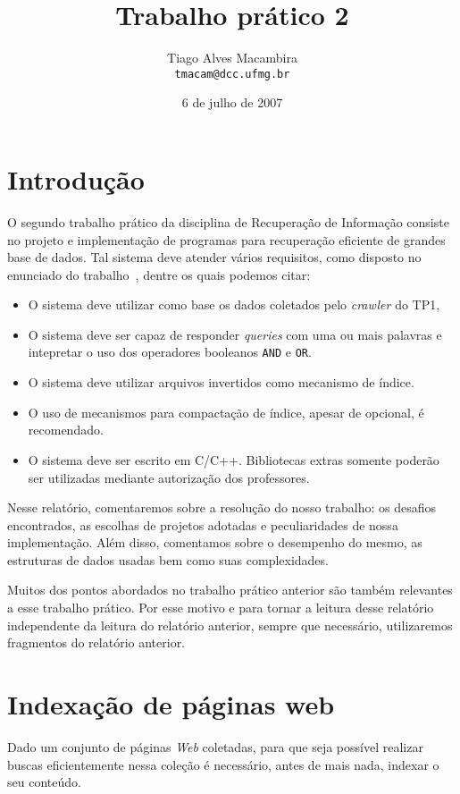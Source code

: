 \documentclass[10pt,twocolumn]{article}
\title{Trabalho prático 2}
\author{Tiago Alves Macambira \\ \texttt{tmacam@dcc.ufmg.br}}
\date{6 de julho de 2007}
\begin{document}
\maketitle

\section{Introdução}

O segundo trabalho prático da disciplina de Recuperação de Informação
consiste no projeto e implementação de programas para
recuperação eficiente de grandes base de dados. Tal sistema deve
 atender vários requisitos, como disposto no
enunciado do trabalho~\cite{tp1}, dentre os quais podemos citar:
\begin{itemize}
\item O sistema deve utilizar como base os dados coletados pelo
\emph{crawler} do TP1,
\item O sistema deve ser capaz de responder \emph{queries} com uma ou
mais palavras e intepretar o uso dos operadores booleanos \texttt{AND}
e \texttt{OR}.
\item O sistema deve utilizar arquivos invertidos como mecanismo
de índice.
\item O uso de mecanismos para compactação de índice, apesar de
opcional, é recomendado.
\item O sistema deve ser escrito em C/C++. Bibliotecas extras somente
poderão ser utilizadas mediante autorização dos professores.
\end{itemize}

Nesse relatório, comentaremos sobre a resolução do nosso trabalho:
os desafios encontrados, as escolhas de projetos
adotadas e peculiaridades de nossa implementação. Além disso, comentamos
sobre o desempenho do mesmo, as estruturas de dados usadas bem como suas
complexidades.

Muitos dos pontos abordados no trabalho prático anterior são também
relevantes a esse trabalho prático. Por esse motivo e para tornar a
leitura desse relatório independente da leitura do relatório anterior,
sempre que necessário, utilizaremos fragmentos do relatório anterior.

\section{Indexação de páginas web}

Dado um conjunto de páginas \emph{Web} coletadas, para que seja possível
realizar buscas eficientemente nessa coleção é necessário, antes de mais
nada, indexar o seu conteúdo.
\end{document}
